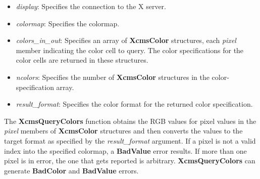 \documentclass{report}
\begin{document}
\begin{itemize}
\begin{itemize}
                \item \textit{display}: Specifies the connection to the X server.
                \item \textit{colormap}: Specifies the colormap.
                \item \textit{colors\_in\_out}: Specifies an array of \textbf{XcmsColor} structures, each \textit{pixel} member indicating the color cell to query. The color specifications for the color cells are returned in these structures.
                \item \textit{ncolors}: Specifies the number of \textbf{XcmsColor} structures in the color-specification array.
                \item \textit{result\_format}: Specifies the color format for the returned color specification.
            \end{itemize}
            \noindent
            The \textbf{XcmsQueryColors} function obtains the RGB values for pixel values in the \textit{pixel} members of \textbf{XcmsColor} structures and then converts the values to the target format as specified by the \textit{result\_format} argument.
            \bigbreak \noindent
            If a pixel is not a valid index into the specified colormap, a \textbf{BadValue} error results. If more than one pixel is in error, the one that gets reported is arbitrary.
            \bigbreak \noindent
            \textbf{XcmsQueryColors} can generate \textbf{BadColor} and \textbf{BadValue} errors.

    \end{itemize}
\end{document}
